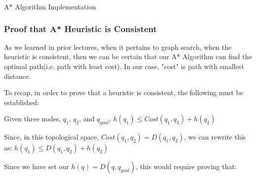 \documentclass{article}
\begin{document}
\begin{algorithm}
\caption{A* Algorithm Implementation}
\begin{algorithmic}

    \ENDIF
    
    
    \ENDIF

    \ENDIF
    \ENDIF
    
    \ENDFOR
    \ENDWHILE
\end{algorithmic}
\end{algorithm}

\newpage 
\subsubsection{Proof that A* Heuristic is Consistent} 
As we learned in prior lectures, when it pertains to graph search, when the heuristic is consistent, then we can be certain that our A* Algorithm can find the optimal path(i.e. path with least cost). In our case, "cost" is path with smallest distance. \newline 

To recap, in order to prove that a heuristic is consistent, the following must be established: \newline 

Given three nodes, $q_1$, $q_2$, and $q_{goal}$, $h(q_1) \leq Cost(q_1, q_2) + h(q_2)$ \newline 

Since, in this topological space, $Cost(q_1, q_2) = D(q_1, q_2)$, we can rewrite this as: \newline 
$h(q_1) \leq D(q_1, q_2) + h(q_2)$ \newline 

Since we have set our $h(q) = D(q, q_{goal})$, this would require proving that: \newline 
\end{document}
